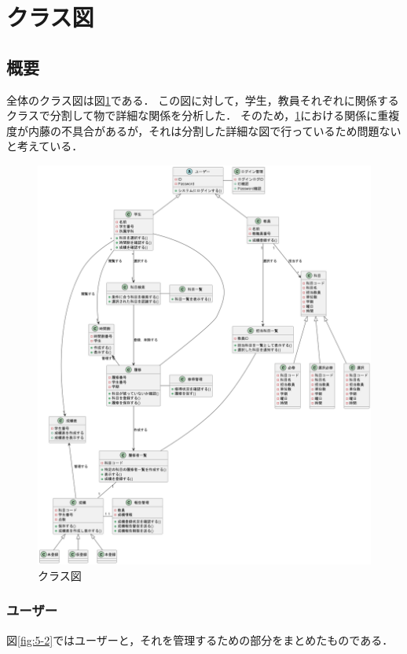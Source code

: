 \documentclass[documentclass]{jsarticle}
\begin{document}
\section{クラス図}
\subsection*{概要}
全体のクラス図は図\ref*{fig:5-1}である．
この図に対して，学生，教員それぞれに関係するクラスで分割して物で詳細な関係を分析した．
そのため，\ref*{fig:5-1}における関係に重複度が内藤の不具合があるが，それは分割した詳細な図で行っているため問題ないと考えている．
\begin{figure}[H]
  \begin{center}
    \includegraphics*[scale=0.3]{figure/5-1.png}
  \end{center}
  \caption{クラス図}
  \label{fig:5-1}
\end{figure}

\subsubsection*{ユーザー}
図\ref*{fig:5-2}ではユーザーと，それを管理するための部分をまとめたものである．
\end{document}
